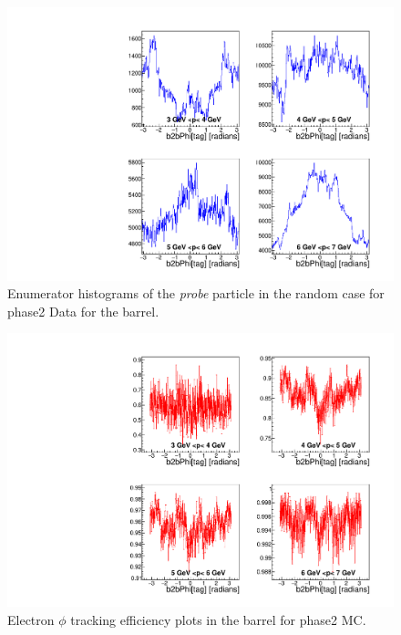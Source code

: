 \documentclass[a4paper,11pt,twosided,final,german,openbib,pdftex,listof=totoc,bibliography=totoc]{scrbook}
\begin{document}
\begin{appendix}
\begin{figure}[!htbp]
	\centering
	\includegraphics[width=\textwidth]{Plots/master/xPMPhiRandomBarrelD_Data}
	\caption[Momentum $\phi$ Random Barrel Denominator Histogram Phase2 Data]{Enumerator histograms of the \textit{probe} particle in the random case for phase2 Data for the barrel.}
	\label{plt:PMPhiRandomBarrelD_Data}
\end{figure}





\begin{figure}[!htbp]
	\centering
	\includegraphics[width=\textwidth]{Plots/master/xPMPhiemBarrel_MC}
	\caption[Momentum $\phi$ Electron Barrel Efficiency Phase2 MC]{Electron $\phi$ tracking efficiency plots in the barrel for phase2 MC.}
	\label{plt:PMPhiemBarrel_MC}
\end{figure}



\end{appendix}
\end{document}
